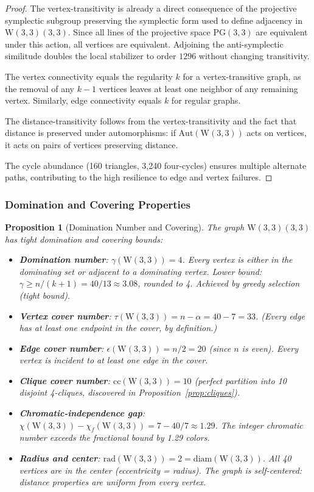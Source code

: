 \documentclass[12pt,a4paper]{article}
\newtheorem{proposition}[theorem]{Proposition}
\newcommand{\W}{\mathrm{W}(3,3)}
\begin{document}
\begin{proof}
The vertex-transitivity is already a direct consequence of the projective symplectic
subgroup preserving the symplectic form used to define adjacency in $\W(3,3)$. Since all
lines of the projective space $\mathrm{PG}(3,3)$ are equivalent under this action, all
vertices are equivalent. Adjoining the anti-symplectic similitude doubles the local
stabilizer to order $1296$ without changing transitivity.

The vertex connectivity equals the regularity $k$ for a vertex-transitive graph, as the
removal of any $k-1$ vertices leaves at least one neighbor of any remaining vertex.
Similarly, edge connectivity equals $k$ for regular graphs.

The distance-transitivity follows from the vertex-transitivity and the fact that
distance is preserved under automorphisms: if $\mathrm{Aut}(\W)$ acts on vertices, it acts
on pairs of vertices preserving distance.

The cycle abundance (160 triangles, 3,240 four-cycles) ensures multiple alternate paths,
contributing to the high resilience to edge and vertex failures.
\end{proof}

\subsubsection{Domination and Covering Properties}

\begin{proposition}[Domination Number and Covering]\label{prop:domination}
The graph $\W(3,3)$ has tight domination and covering bounds:
\begin{itemize}
  \item \textbf{Domination number}: $\gamma(\W) = 4$.
        Every vertex is either in the dominating set or adjacent to a dominating vertex.
        Lower bound: $\gamma \ge n/(k+1) = 40/13 \approx 3.08$, rounded to 4.
        Achieved by greedy selection (tight bound).
  \item \textbf{Vertex cover number}: $\tau(\W) = n - \alpha = 40 - 7 = 33$.
        (Every edge has at least one endpoint in the cover, by definition.)
  \item \textbf{Edge cover number}: $\epsilon(\W) = n/2 = 20$ (since $n$ is even).
        Every vertex is incident to at least one edge in the cover.
  \item \textbf{Clique cover number}: $\mathrm{cc}(\W) = 10$ (perfect partition into
        10 disjoint 4-cliques, discovered in Proposition~\ref{prop:cliques}).
  \item \textbf{Chromatic-independence gap}: $\chi(\W) - \chi_f(\W) = 7 - 40/7 \approx 1.29$.
        The integer chromatic number exceeds the fractional bound by 1.29 colors.
  \item \textbf{Radius and center}: $\mathrm{rad}(\W) = 2 = \mathrm{diam}(\W)$.
        All 40 vertices are in the center (eccentricity = radius).
        The graph is \emph{self-centered}: distance properties are uniform from every vertex.
\end{itemize}
\end{proposition}
\end{document}
